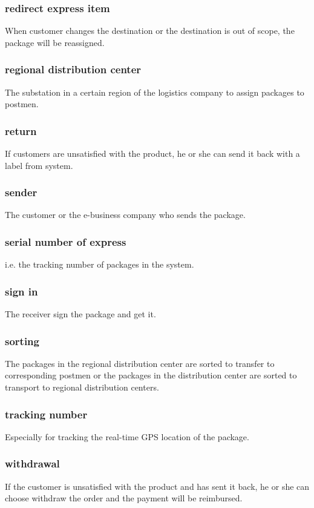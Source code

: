 \documentclass[12pt]{scrreprt}
\begin{document}
\begin{spacing}{0.7}
\subsubsection{redirect express item}
When customer changes the destination or the destination is out of scope,
the package will be reassigned.
\subsubsection{regional distribution center}
The substation in a certain region of the logistics company to assign
packages to postmen.
\subsubsection{return}
If customers are unsatisfied with the product, he or she can send it back
with a label from system.
\subsubsection{sender}
The customer or the e-business company who sends the package.
\subsubsection{serial number of express}
i.e. the tracking number of packages in the system.
\subsubsection{sign in}
The receiver sign the package and get it.
\subsubsection{sorting}
The packages in the regional distribution center are sorted to transfer to
corresponding postmen or the packages in the distribution center are sorted to
transport to regional distribution centers.
\subsubsection{tracking number}
Especially for tracking the real-time GPS location of the package.
\subsubsection{withdrawal}
If the customer is unsatisfied with the product and has sent it back,
he or she can choose withdraw the order and the payment will be reimbursed.
\end{spacing}
\end{document}
